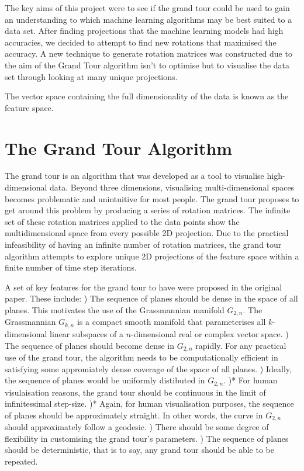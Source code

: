 \documentclass[a4paper,11pt,twoside]{article}
\begin{document}
The key aims of this project were to see if the grand tour could be used to gain an understanding to which machine learning algorithms may be best suited to a data set. After finding projections that the machine learning models had high accuracies, we decided to attempt to find new rotations that maximised the accuracy. A new technique to generate rotation matrices was constructed due to the aim of the Grand Tour algorithm isn’t to optimise but to visualise the data set through looking at many unique projections.
\newline

The vector space containing the full dimensionality of the data is known as the feature space.

\newpage
\section{The Grand Tour Algorithm}

The grand tour is an algorithm that was developed as a tool to visualise high-dimensional data. Beyond three dimensions, visualising multi-dimensional spaces becomes problematic and unintuitive for most people. The grand tour proposes to get around this problem by producing a series of rotation matrices. The infinite set of these rotation matrices applied to the data points show the multidimensional space from every possible 2D projection. Due to the practical infeasibility of having an infinite number of rotation matrices, the grand tour algorithm attempts to explore unique 2D projections of the feature space within a finite number of time step iterations. 
\newline

A set of key features for the grand tour to have were proposed in the original paper. These include:
) The sequence of planes should be dense in the space of all planes. This motivates the use of the Grassmannian manifold $G_{2,n}$. The Grassmannian $G_{k,n}$ is a compact smooth manifold that parameterises all $k$-dimensional linear subspaces of a $n$-dimensional real or complex vector space.
) The sequence of planes should become dense in $G_{2,n}$ rapidly. For any practical use of the grand tour, the algorithm needs to be computationally efficient in satisfying some appromiately dense coverage of the space of all planes.
) Ideally, the sequence of planes would be uniformly distibuted in $G_{2,n}$.
)* For human visulaisation reasons, the grand tour should be continuous in the limit of infinitessimal step-size.
)* Again, for human visualisation purposes, the sequence of planes should be approximately straight. In other words, the curve in $G_{2,n}$ should approximately follow a geodesic.
) There should be some degree of flexibility in customising the grand tour's parameters.
) The sequence of planes should be deterministic, that is to say, any grand tour should be able to be repeated.
\newline
\end{document}
